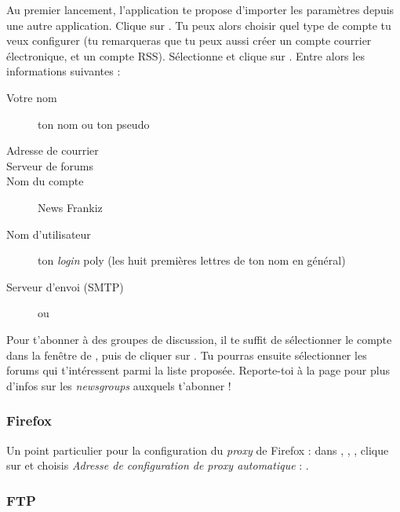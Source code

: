 Au premier lancement, l'application te propose d'importer les paramètres depuis une autre application. Clique sur . Tu peux alors choisir quel type de compte tu veux configurer (tu remarqueras que tu peux aussi créer un compte courrier électronique, et un compte RSS). Sélectionne  et clique sur . Entre alors les informations suivantes :

\begin{description}
  \item[Votre nom] ton nom ou ton pseudo
  \item[Adresse de courrier] 
  \item[Serveur de forums] 
  \item[Nom du compte] News Frankiz
  \item[Nom d'utilisateur] ton \emph{login }poly (les huit premières lettres de ton nom en général)
  \item[Serveur d'envoi (SMTP)]  ou 
\end{description}


Pour t'abonner à des groupes de discussion, il te suffit de sélectionner le compte  dans la fenêtre  de , puis de cliquer sur . Tu pourras ensuite sélectionner les forums qui t'intéressent parmi la liste proposée. Reporte-toi à la page \pageref{newsgroups} pour plus d'infos sur les \emph{newsgroups} auxquels t'abonner !

\subsubsection{Firefox}
Un point particulier pour la configuration du \emph{proxy} de Firefox : dans , , , clique sur  et choisis \emph{Adresse de configuration de proxy automatique} : .



\subsubsection{FTP}

